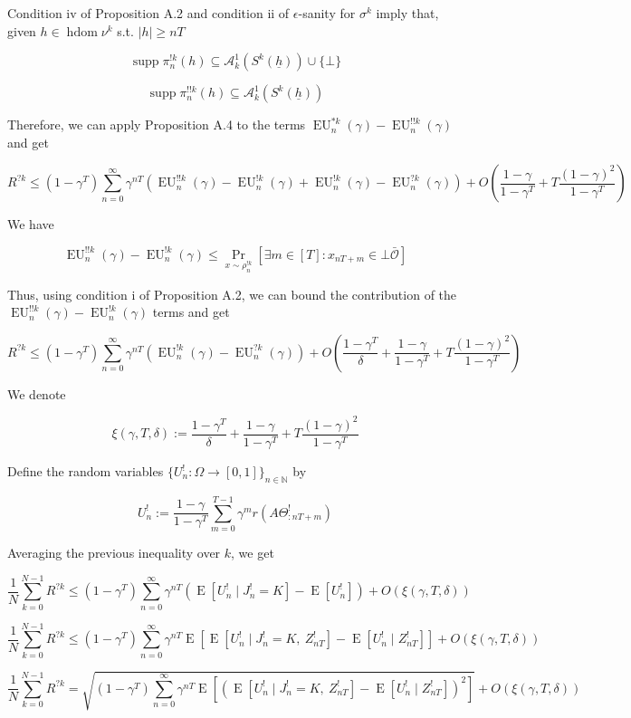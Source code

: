 \documentclass[a4paper]{article}
\DeclareMathOperator{\Supp}{supp}
\newcommand{\E}[1]{\underset{#1}{\operatorname{E}}}
\newcommand{\Nats}{\mathbb{N}}
\newcommand{\Sq}[2]{\{#1\}_{#2 \in \Nats}}
\newcommand{\Sqn}[1]{\Sq{#1}{n}}
\newcommand{\Abs}[1]{\left\vert #1 \right\vert}
\newcommand{\Ob}{\mathcal{O}}
\newcommand{\A}{\mathcal{A}}
\newcommand{\Ado}{\bar{\Ob}}
\DeclareMathOperator{\HD}{hdom}
\newcommand{\EU}{\operatorname{EU}}
\newcommand{\J}{J}
\begin{document}
Condition iv of Proposition A.2 and condition ii of $\epsilon$-sanity for $\sigma^k$ imply that, given $h \in \HD{\nu^k}$ s.t. $\Abs{h} \geq nT$

$$\Supp{\pi^{!k}_n(h)} \subseteq \A^1_k\left(S^k\left(\underline{h}\right)\right) \cup \{\bot\}$$

$$\Supp{\pi^{!!k}_n(h)} \subseteq \A^1_k\left(S^k\left(\underline{h}\right)\right)$$

Therefore, we can apply Proposition A.4 to the terms $\EU^{*k}_n(\gamma)-\EU^{!!k}_n(\gamma)$ and get

$$R^{?k} \leq (1-\gamma^T)\sum_{n=0}^\infty \gamma^{nT} \left(\EU^{!!k}_n(\gamma)-\EU^{!k}_n(\gamma)+\EU^{!k}_n(\gamma)-\EU^{?k}_n(\gamma)\right) + O\left(\frac{1-\gamma}{1-\gamma^T}+T\frac{(1-\gamma)^2}{1-\gamma^T}\right)$$

We have

$$\EU^{!!k}_n(\gamma)-\EU^{!k}_n(\gamma) \leq \Pr_{x\sim\rho^{!k}_n}\left[\exists m \in [T]: x_{nT+m} \in \bot\Ado\right]$$

Thus, using condition i of Proposition A.2, we can bound the contribution of the $\EU^{!!k}_n(\gamma)-\EU^{!k}_n(\gamma)$ terms and get

$$R^{?k} \leq (1-\gamma^T)\sum_{n=0}^\infty \gamma^{nT} \left(\EU^{!k}_n(\gamma)-\EU^{?k}_n(\gamma)\right) + O\left(\frac{1-\gamma^T}{\delta}+\frac{1-\gamma}{1-\gamma^T}+T\frac{(1-\gamma)^2}{1-\gamma^T}\right)$$

We denote

$$\xi(\gamma,T,\delta):=\frac{1-\gamma^T}{\delta}+\frac{1-\gamma}{1-\gamma^T}+T\frac{(1-\gamma)^2}{1-\gamma^T}$$

Define the random variables $\Sqn{U^!_n : \Omega \rightarrow [0,1]}$ by 

$$U^!_n:=\frac{1-\gamma}{1-\gamma^T}\sum_{m=0}^{T-1} \gamma^{m} r\left(A\Theta^!_{:nT+m}\right)$$

Averaging the previous inequality over $k$, we get

$$\frac{1}{N}\sum_{k=0}^{N-1}R^{?k} \leq (1-\gamma^T)\sum_{n=0}^\infty \gamma^{nT} \left(\E{}\left[U^!_n \mid \J^!_n = K\right]-\E{}\left[U^!_n\right]\right) + O\left(\xi(\gamma,T,\delta)\right)$$

$$\frac{1}{N}\sum_{k=0}^{N-1}R^{?k} \leq (1-\gamma^T)\sum_{n=0}^\infty \gamma^{nT} \E{}\left[\E{}\left[U^!_n \mid \J^!_n = K,\ Z^!_{nT}\right]-\E{}\left[U^!_n \mid Z^!_{nT}\right]\right] + O\left(\xi(\gamma,T,\delta)\right)$$

$$\frac{1}{N}\sum_{k=0}^{N-1}R^{?k} = \sqrt{(1-\gamma^T)\sum_{n=0}^\infty \gamma^{nT} \E{}\left[\left(\E{}\left[U^!_n \mid \J^!_n = K,\ Z^!_{nT}\right]-\E{}\left[U^!_n \mid Z^!_{nT}\right]\right)^2\right]} + O\left(\xi(\gamma,T,\delta)\right)$$
\end{document}
